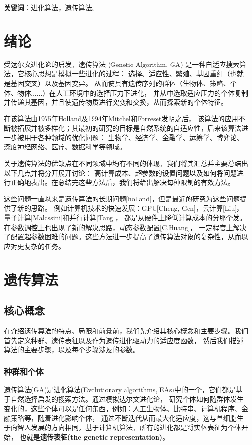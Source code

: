 \documentclass[12pt, a4paper, oneside]{ctexart}
\numberwithin{equation}{section}  %
\begin{document}
\textbf{关键词}：进化算法，遗传算法。
\clearpage
{}
\thispagestyle{tablestyle}
\tableofcontents %

\clearpage
\setcounter{page}{1}
\section{绪论}
受达尔文进化论的启发，遗传算法 (Genetic Algorithm, GA) 是一种自适应搜索算法，它核心思想是模拟一些进化的过程：
选择、适应性、繁殖、基因重组（也就是基因交叉）以及基因变异。 
从而使具有遗传序列的群体（生物体、策略、个体、物体......）在人工环境中的选择压力下进化，
并从中选取适应压力的个体复制并传递其基因，并且使遗传物质进行突变和交换，从而探索新的个体特征。

在该算法由1975年Holland及1994年Mitchel和Forreset发明之后，
该算法的应用不断被拓展并被多样化；其最初的研究的目标是自然系统的自适应性，后来该算法进一步被用于各种领域的优化问题：
生物学、经济学、金融学、运筹学、博弈论、深度神经网络、医疗、数据科学等领域。

关于遗传算法的优缺点在不同领域中均有不同的体现，我们将其汇总并主要总结出以下几点并将分开展开讨论：
高计算成本、超参数的设置问题以及如何将问题进行正确地表出。在总结完这些方法后，我们将给出解决每种限制的有效方法。

这些问题一直以来是遗传算法的长期问题[holland]，但是最近的研究为这些问题提供了新的思路。
例如计算机技术的快速发展：GPU[Cheng, Gen]，云计算[Liu]，量子计算[Malossini]和并行计算[Tang]，
都是从硬件上降低计算成本的分那个发。在参数调控上也出现了新的解决思路，动态参数配置[C.Huang]，
一定程度上解决了配置超参数困难的问题。这些方法进一步提高了遗传算法对象的复杂性，从而以应对更复杂的任务。

\clearpage
\section{遗传算法}
\subsection{核心概念}
在介绍遗传算法的特点、局限和前景前，我们先介绍其核心概念和主要步骤。我们首先定义种群、遗传表征以及作为遗传进化驱动力的适应度函数，
然后我们描述算法的主要步骤，以及每个步骤涉及的参数。
\subsubsection{种群和个体}
遗传算法(GA)是进化算法(Evolutionary algorithms, EAs)中的一个，它们都是基于自然选择启发的搜索方法。通过模拟达尔文进化论，
研究个体如何随群体发生变化的，这些个体可以是任何东西，例如：人工生物体、比特串、计算机程序、金融策略等，随着进化影响个体，
通过不断迭代从而最大化适应度，这与单细胞生于向智人发展的方向相同。基于计算机算法，所有的进化都是将实体表征为个体开始，
也就是\textbf{遗传表征(the genetic representation)}。
\end{document}
